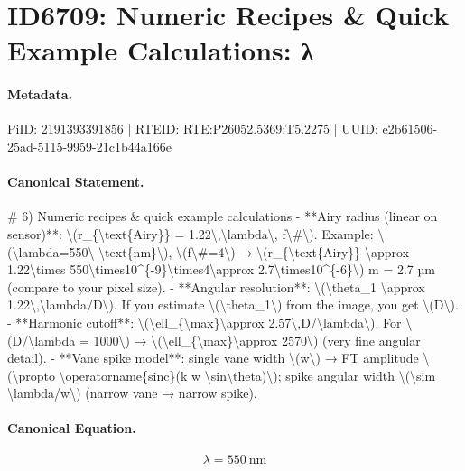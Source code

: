 \section*{ID6709: Numeric Recipes \& Quick Example Calculations: λ}
\paragraph{Metadata.}
PiID: 2191393391856 | RTEID: RTE:P26052.5369:T5.2275 | UUID: e2b61506-25ad-5115-9959-21c1b44a166e

\paragraph{Canonical Statement.}
\# 6) Numeric recipes \& quick example calculations - **Airy radius (linear on sensor)**: \textbackslash{}(r\_\{\textbackslash{}text\{Airy\}\} = 1.22\textbackslash{},\textbackslash{}lambda\textbackslash{}, f\textbackslash{}\#\textbackslash{}). Example: \textbackslash{}(\textbackslash{}lambda=550\textbackslash{} \textbackslash{}text\{nm\}\textbackslash{}), \textbackslash{}(f\textbackslash{}\#=4\textbackslash{}) → \textbackslash{}(r\_\{\textbackslash{}text\{Airy\}\} \textbackslash{}approx 1.22\textbackslash{}times 550\textbackslash{}times10\textasciicircum{}\{-9\}\textbackslash{}times4\textbackslash{}approx 2.7\textbackslash{}times10\textasciicircum{}\{-6\}\textbackslash{}) m = 2.7 µm (compare to your pixel size). - **Angular resolution**: \textbackslash{}(\textbackslash{}theta\_1 \textbackslash{}approx 1.22\textbackslash{},\textbackslash{}lambda/D\textbackslash{}). If you estimate \textbackslash{}(\textbackslash{}theta\_1\textbackslash{}) from the image, you get \textbackslash{}(D\textbackslash{}). - **Harmonic cutoff**: \textbackslash{}(\textbackslash{}ell\_\{\textbackslash{}max\}\textbackslash{}approx 2.57\textbackslash{},D/\textbackslash{}lambda\textbackslash{}). For \textbackslash{}(D/\textbackslash{}lambda = 1000\textbackslash{}) → \textbackslash{}(\textbackslash{}ell\_\{\textbackslash{}max\}\textbackslash{}approx 2570\textbackslash{}) (very fine angular detail). - **Vane spike model**: single vane width \textbackslash{}(w\textbackslash{}) → FT amplitude \textbackslash{}(\textbackslash{}propto \textbackslash{}operatorname\{sinc\}(k w \textbackslash{}sin\textbackslash{}theta)\textbackslash{}); spike angular width \textbackslash{}(\textbackslash{}sim \textbackslash{}lambda/w\textbackslash{}) (narrow vane → narrow spike).

\paragraph{Canonical Equation.}
\[
\lambda=550\ \text{nm}
\]

